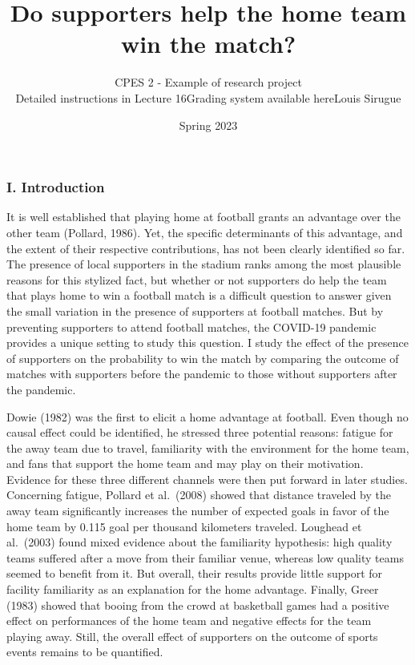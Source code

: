 \documentclass[
]{article}
\title{Do supporters help the home team win the match?}
\author{CPES 2 - Example of research project

Detailed instructions in Lecture 16Grading system available hereLouis
Sirugue}
\date{Spring 2023}
\begin{document}
\maketitle

\hypertarget{i.-introduction}{%
\subsubsection{I. Introduction}\label{i.-introduction}}

It is well established that playing home at football grants an advantage
over the other team (Pollard, 1986). Yet, the specific determinants of
this advantage, and the extent of their respective contributions, has
not been clearly identified so far. The presence of local supporters in
the stadium ranks among the most plausible reasons for this stylized
fact, but whether or not supporters do help the team that plays home to
win a football match is a difficult question to answer given the small
variation in the presence of supporters at football matches. But by
preventing supporters to attend football matches, the COVID-19 pandemic
provides a unique setting to study this question. I study the effect of
the presence of supporters on the probability to win the match by
comparing the outcome of matches with supporters before the pandemic to
those without supporters after the pandemic.

Dowie (1982) was the first to elicit a home advantage at football. Even
though no causal effect could be identified, he stressed three potential
reasons: fatigue for the away team due to travel, familiarity with the
environment for the home team, and fans that support the home team and
may play on their motivation. Evidence for these three different
channels were then put forward in later studies. Concerning fatigue,
Pollard et al.~(2008) showed that distance traveled by the away team
significantly increases the number of expected goals in favor of the
home team by 0.115 goal per thousand kilometers traveled. Loughead et
al.~(2003) found mixed evidence about the familiarity hypothesis: high
quality teams suffered after a move from their familiar venue, whereas
low quality teams seemed to benefit from it. But overall, their results
provide little support for facility familiarity as an explanation for
the home advantage. Finally, Greer (1983) showed that booing from the
crowd at basketball games had a positive effect on performances of the
home team and negative effects for the team playing away. Still, the
overall effect of supporters on the outcome of sports events remains to
be quantified.
\end{document}
